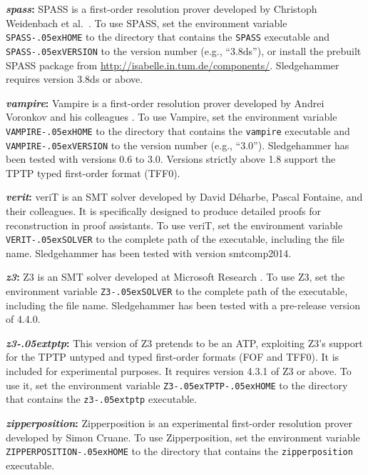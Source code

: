 \documentclass[a4paper,12pt]{article}
\newcommand\download{\url{http://isabelle.in.tum.de/components/}}
\renewcommand\_{\hbox{\textunderscore\kern-.05ex}}
\begin{document}
\begin{enum}
\begin{sloppy}
\begin{enum}
\item[\labelitemi] \textbf{\textit{spass}:} SPASS is a first-order resolution
prover developed by Christoph Weidenbach et al.\ \cite{weidenbach-et-al-2009}.
To use SPASS, set the environment variable \texttt{SPASS\_HOME} to the directory
that contains the \texttt{SPASS} executable and \texttt{SPASS\_VERSION} to the
version number (e.g., ``3.8ds''), or install the prebuilt SPASS package from
\download. Sledgehammer requires version 3.8ds or above.

\item[\labelitemi] \textbf{\textit{vampire}:} Vampire is a first-order
resolution prover developed by Andrei Voronkov and his colleagues
\cite{riazanov-voronkov-2002}. To use Vampire, set the environment variable
\texttt{VAMPIRE\_HOME} to the directory that contains the \texttt{vampire}
executable and \texttt{VAMPIRE\_VERSION} to the version number (e.g.,
``3.0''). Sledgehammer has been tested with versions 0.6 to 3.0.
Versions strictly above 1.8 support the TPTP typed first-order format (TFF0).

\item[\labelitemi] \textbf{\textit{verit}:} veriT \cite{bouton-et-al-2009} is an
SMT solver developed by David Déharbe, Pascal Fontaine, and their colleagues.
It is specifically designed to produce detailed proofs for reconstruction in
proof assistants. To use veriT, set the environment variable
\texttt{VERIT\_SOLVER} to the complete path of the executable, including the
file name. Sledgehammer has been tested with version smtcomp2014.

\item[\labelitemi] \textbf{\textit{z3}:} Z3 is an SMT solver developed at
Microsoft Research \cite{z3}. To use Z3, set the environment variable
\texttt{Z3\_SOLVER} to the complete path of the executable, including the
file name. Sledgehammer has been tested with a pre-release version of 4.4.0.

\item[\labelitemi] \textbf{\textit{z3\_tptp}:} This version of Z3 pretends to be
an ATP, exploiting Z3's support for the TPTP untyped and typed first-order
formats (FOF and TFF0). It is included for experimental purposes. It requires
version 4.3.1 of Z3 or above. To use it, set the environment variable
\texttt{Z3\_TPTP\_HOME} to the directory that contains the \texttt{z3\_tptp}
executable.

\item[\labelitemi] \textbf{\textit{zipperposition}:} Zipperposition
\cite{cruanes-2014} is an experimental first-order resolution prover developed
by Simon Cruane. To use Zipperposition, set the environment variable
\texttt{ZIPPERPOSITION\_HOME} to the directory that contains the
\texttt{zipperposition} executable.
\end{enum}


\end{sloppy}
\end{enum}
\end{document}
